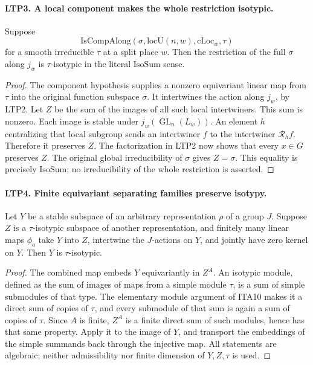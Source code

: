 \documentclass[11pt,a4paper]{article}
\numberwithin{equation}{section}
\theoremstyle{remark}\newtheorem{remark}[theorem]{Remark}
\begin{document}
\paragraph{LTP3. A local component makes the whole restriction isotypic.}
\label{claim:LTP3}
Suppose
\[
 \mathrm{IsCompAlong}\!
 \left(\sigma,\mathrm{locU}(n,w),\mathrm{cLoc}_w,\tau\right)
\]
for a smooth irreducible \(\tau\) at a split place \(w\).
Then the restriction of the full \(\sigma\) along \(j_w\) is
\(\tau\)-isotypic in the literal \(\mathrm{IsoSum}\) sense.
\begin{proof}
The component hypothesis supplies a nonzero equivariant linear map
from \(\tau\) into the original function subspace \(\sigma\).  It
intertwines the action along \(j_w\), by LTP2.  Let \(Z\) be the sum
of the images of all such local intertwiners.  This sum is nonzero.
Each image is stable under \(j_w(\operatorname{GL}_n(L_w))\).
An element \(h\) centralizing that local subgroup sends an intertwiner
\(f\) to the intertwiner \(\mathscr R_hf\).  Therefore it preserves
\(Z\).  The factorization in LTP2 now shows that every \(x\in G\)
preserves \(Z\).  The original global irreducibility of \(\sigma\)
gives \(Z=\sigma\).  This equality is precisely \(\mathrm{IsoSum}\);
no irreducibility of the whole restriction is asserted.
\end{proof}

\paragraph{LTP4. Finite equivariant separating families preserve isotypy.}
\label{claim:LTP4}
Let \(Y\) be a stable subspace of an arbitrary representation
\(\rho\) of a group \(J\).  Suppose \(Z\) is a \(\tau\)-isotypic
subspace of another representation, and finitely many linear maps
\(\phi_a\) take \(Y\) into \(Z\), intertwine the \(J\)-actions on
\(Y\), and jointly have zero kernel on \(Y\).  Then \(Y\) is
\(\tau\)-isotypic.
\begin{proof}
The combined map embeds \(Y\) equivariantly in \(Z^A\).
An isotypic module, defined as the sum of images of maps from a
simple module \(\tau\), is a sum of simple submodules of that type.
The elementary module argument of ITA10 makes it a direct sum of
copies of \(\tau\), and every submodule of that sum is again a sum
of copies of \(\tau\).  Since \(A\) is finite, \(Z^A\) is a finite
direct sum of such modules, hence has that same property.  Apply
it to the image of \(Y\), and transport the embeddings of the
simple summands back through the injective map.
All statements are algebraic; neither admissibility nor finite
dimension of \(Y,Z,\tau\) is used.
\end{proof}
\end{document}
